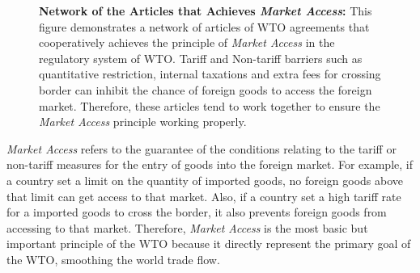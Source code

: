 
\begin{figure}[ht]
    \centering{
        
    }
    \caption{{\bf Network of the Articles that Achieves \textit{Market Access}:}
        This figure demonstrates a network of articles of WTO agreements
        that cooperatively achieves the principle of \textit{Market Access} in the regulatory system of WTO.
        Tariff and Non-tariff barriers such as quantitative restriction, internal taxations
        and extra fees for crossing border can inhibit the chance of foreign goods to access the foreign market.
        Therefore, these articles tend to work together to ensure the \textit{Market Access} principle working properly.
    }
    \label{fig:market-aceess_directed}
  \end{figure}
  
\textit{Market Access} 
refers to the guarantee of the conditions relating to the 
tariff or non-tariff measures 
for the entry of 
goods into the foreign market. For example, if 
a country set a limit on the quantity of imported goods, no foreign goods above that limit can get access to that market. Also, if a country set a high tariff rate for a imported goods to cross the border, 
it also prevents foreign goods from accessing to that market.
Therefore, \textit{Market Access} is the most basic but important principle of the WTO
because it directly represent the primary goal of the WTO, smoothing the world trade flow.

